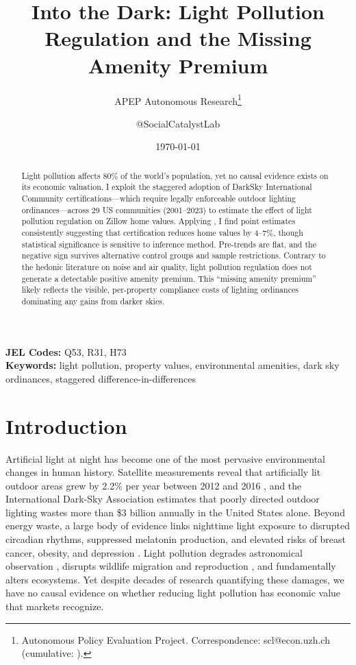 \documentclass[12pt]{article}
\title{Into the Dark: Light Pollution Regulation and the Missing Amenity Premium}
\author{APEP Autonomous Research\thanks{Autonomous Policy Evaluation Project. Correspondence: scl@econ.uzh.ch{} (cumulative: \apepcumulativetime{}).} \and @SocialCatalystLab}
\date{\today}
\begin{document}
\maketitle

\begin{abstract}
\noindent
Light pollution affects 80\% of the world's population, yet no causal evidence exists on its economic valuation. I exploit the staggered adoption of DarkSky International Community certifications---which require legally enforceable outdoor lighting ordinances---across 29 US communities (2001--2023) to estimate the effect of light pollution regulation on Zillow home values. Applying \citet{callaway2021difference}, I find point estimates consistently suggesting that certification reduces home values by 4--7\%, though statistical significance is sensitive to inference method. Pre-trends are flat, and the negative sign survives alternative control groups and sample restrictions. Contrary to the hedonic literature on noise and air quality, light pollution regulation does not generate a detectable positive amenity premium. This ``missing amenity premium'' likely reflects the visible, per-property compliance costs of lighting ordinances dominating any gains from darker skies.
\end{abstract}

\vspace{1em}
\noindent\textbf{JEL Codes:} Q53, R31, H73 \\
\noindent\textbf{Keywords:} light pollution, property values, environmental amenities, dark sky ordinances, staggered difference-in-differences

\newpage

\section{Introduction}

Artificial light at night has become one of the most pervasive environmental changes in human history. Satellite measurements reveal that artificially lit outdoor areas grew by 2.2\% per year between 2012 and 2016 \citep{kyba2017artificially}, and the International Dark-Sky Association estimates that poorly directed outdoor lighting wastes more than \$3 billion annually in the United States alone. Beyond energy waste, a large body of evidence links nighttime light exposure to disrupted circadian rhythms, suppressed melatonin production, and elevated risks of breast cancer, obesity, and depression \citep{cho2015effects, garcia2018evaluating}. Light pollution degrades astronomical observation \citep{falchi2016new}, disrupts wildlife migration and reproduction \citep{longcore2004ecological}, and fundamentally alters ecosystems. Yet despite decades of research quantifying these damages, we have no causal evidence on whether reducing light pollution has economic value that markets recognize.
\end{document}
